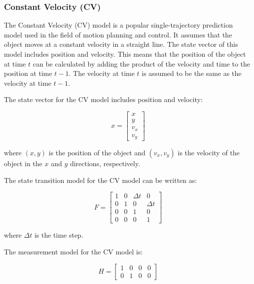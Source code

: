 \subsubsection{Constant Velocity (CV)}
\label{subsubsec:3_CV}

The Constant Velocity (CV) model is a popular single-trajectory prediction model used in the field of motion planning and control. It assumes that the object moves at a constant velocity in a straight line. The state vector of this model includes position and velocity. This means that the position of the object at time $t$ can be calculated by adding the product of the velocity and time to the position at time $t-1$. The velocity at time $t$ is assumed to be the same as the velocity at time $t-1$.

The state vector for the CV model includes position and velocity:

\begin{equation}
	x = \begin{bmatrix}x \\
		               y \\
		               v_x \\
		               v_y
	    \end{bmatrix}
\end{equation}

where $(x,y)$ is the position of the object and $(v_x,v_y)$ is the velocity of the object in the $x$ and $y$ directions, respectively.

The state transition model for the CV model can be written as:

\begin{equation}
	F = \begin{bmatrix}
		 			   1 & 0 & \Delta t & 0 \\
		               0 & 1 & 0 & \Delta t \\
		               0 & 0 & 1 & 0 \\
		               0 & 0 & 0 & 1
		\end{bmatrix}
\end{equation}

where $\Delta t$ is the time step.

The measurement model for the CV model is:

\begin{equation}
	H = \begin{bmatrix}
		1 & 0 & 0 & 0 \\
		0 & 1 & 0 & 0
	    \end{bmatrix}
\end{equation}

